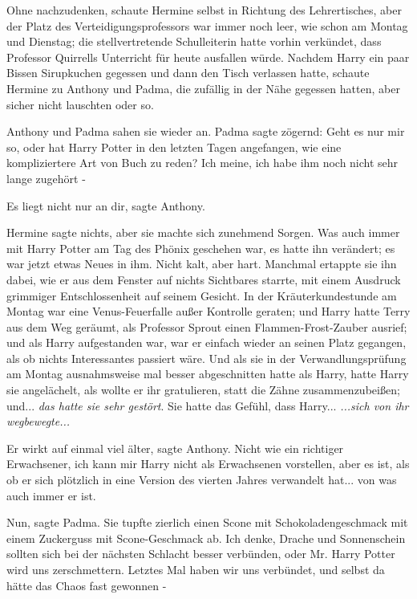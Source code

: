 Ohne nachzudenken, schaute Hermine selbst in Richtung des Lehrertisches, aber
der Platz des Verteidigungsprofessors war immer noch leer, wie schon am Montag
und Dienstag; die stellvertretende Schulleiterin hatte vorhin verkündet, dass
Professor Quirrells Unterricht für heute ausfallen würde. Nachdem Harry ein paar
Bissen Sirupkuchen gegessen und dann den Tisch verlassen hatte, schaute Hermine
zu Anthony und Padma, die zufällig in der Nähe gegessen hatten, aber sicher
nicht lauschten oder so.

Anthony und Padma sahen sie wieder an. Padma sagte zögernd: \glqq{}Geht es nur
mir so, oder hat Harry Potter in den letzten Tagen angefangen, wie eine
kompliziertere Art von Buch zu reden? Ich meine, ich habe ihm noch nicht sehr
lange zugehört -\grqq{}

\glqq{}Es liegt nicht nur an dir\grqq{}, sagte Anthony.

Hermine sagte nichts, aber sie machte sich zunehmend Sorgen. Was auch immer mit
Harry Potter am Tag des Phönix geschehen war, es hatte ihn verändert; es war
jetzt etwas Neues in ihm. Nicht kalt, aber hart. Manchmal ertappte sie ihn
dabei, wie er aus dem Fenster auf nichts Sichtbares starrte, mit einem Ausdruck
grimmiger Entschlossenheit auf seinem Gesicht. In der Kräuterkundestunde am
Montag war eine Venus-Feuerfalle außer Kontrolle geraten; und Harry hatte Terry
aus dem Weg geräumt, als Professor Sprout einen Flammen-Frost-Zauber ausrief;
und als Harry aufgestanden war, war er einfach wieder an seinen Platz gegangen,
als ob nichts Interessantes passiert wäre. Und als sie in der
Verwandlungsprüfung am Montag ausnahmsweise mal besser abgeschnitten hatte als
Harry, hatte Harry sie angelächelt, als wollte er ihr gratulieren, statt die
Zähne zusammenzubeißen; und... \emph{das hatte sie sehr gestört}. Sie hatte das
Gefühl, dass Harry...\emph{ ...sich von ihr wegbewegte...}

\glqq{}Er wirkt auf einmal viel älter\grqq{}, sagte Anthony. \glqq{}Nicht wie ein
richtiger Erwachsener, ich kann mir Harry nicht als Erwachsenen vorstellen, aber
es ist, als ob er sich plötzlich in eine Version des vierten Jahres verwandelt
hat... von was auch immer er ist.\grqq{}

\glqq{}Nun\grqq{}, sagte Padma. Sie tupfte zierlich einen Scone mit
Schokoladengeschmack mit einem Zuckerguss mit Scone-Geschmack ab. \glqq{}Ich
denke, Drache und Sonnenschein sollten sich bei der nächsten Schlacht besser
verbünden, oder Mr. Harry Potter wird uns zerschmettern. Letztes Mal haben wir
uns verbündet, und selbst da hätte das Chaos fast gewonnen -\grqq{}

